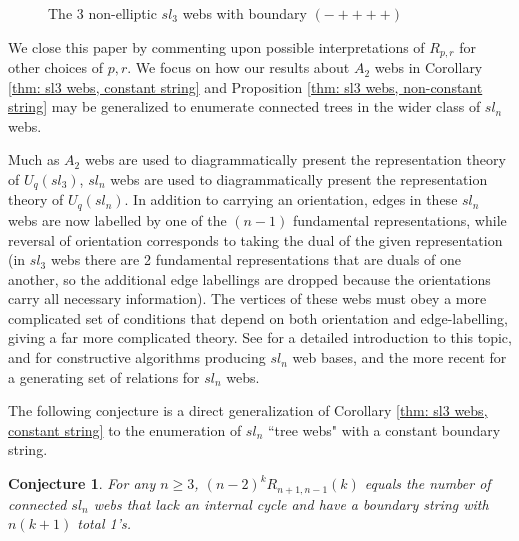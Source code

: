 \documentclass[documentfleqn,12pt]{amsart}
\newtheorem{conjecture}[theorem]{Conjecture}
\begin{document}
\begin{figure}[h!]

\caption{The 3 non-elliptic $sl_3$ webs with boundary $(-++++)$}
\label{fig: sl3 webs non-constant}
\end{figure}


We close this paper by commenting upon possible interpretations of $R_{p,r}$ for other choices of $p,r$.  We focus on how our results about $A_2$ webs in Corollary \ref{thm: sl3 webs, constant string} and Proposition \ref{thm: sl3 webs, non-constant string} may be generalized to enumerate connected trees in the wider class of $sl_n$ webs.

Much as $A_2$ webs are used to diagrammatically present the representation theory of $U_q(sl_3)$, $sl_n$ webs are used to diagrammatically present the representation theory of $U_q(sl_n)$.  In addition to carrying an orientation, edges in these $sl_n$ webs are now labelled by one of the $(n-1)$ fundamental representations, while reversal of orientation corresponds to taking the dual of the given representation (in $sl_3$ webs there are 2 fundamental representations that are duals of one another, so the additional edge labellings are dropped because the orientations carry all necessary information).  The vertices of these webs must obey a more complicated set of conditions that depend on both orientation and edge-labelling, giving a far more complicated theory.  See \cite{Mor} for a detailed introduction to this topic, \cite{Fon} and \cite{West} for constructive algorithms producing $sl_n$ web bases, and the more recent \cite{CKM} for a generating set of relations for $sl_n$ webs.

The following conjecture is a direct generalization of Corollary \ref{thm: sl3 webs, constant string} to the enumeration of $sl_n$ ``tree webs" with a constant boundary string.

\begin{conjecture}
\label{thm: sln webs, constant}
For any $n \geq 3$, $ (n-2)^k R_{n+1,n-1}(k)$ equals the number of connected $sl_n$ webs that lack an internal cycle and have a boundary string with $n(k+1)$ total 1's.
\end{conjecture}
\end{document}
